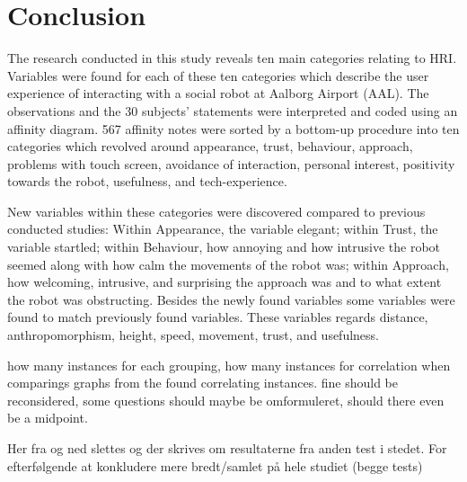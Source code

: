 \section{Conclusion}
\label{Conclusion}
%
The research conducted in this study reveals ten main categories relating to HRI. Variables were found for each of these ten categories which describe the user experience of interacting with a social robot at Aalborg Airport (AAL). The observations and the 30 subjects' statements were interpreted and coded using an affinity diagram. 567 affinity notes were sorted by a bottom-up procedure into ten categories which revolved around appearance, trust, behaviour, approach, problems with touch screen, avoidance of interaction, personal interest, positivity towards the robot, usefulness, and tech-experience.

New variables within these categories were discovered compared to previous conducted studies: Within Appearance, the variable elegant; within Trust, the variable startled; within Behaviour, how annoying and how intrusive the robot seemed along with how calm the movements of the robot was; within Approach, how welcoming, intrusive, and surprising the approach was and to what extent the robot was obstructing. Besides the newly found variables some variables were found to match previously found variables. These variables regards distance, anthropomorphism, height, speed, movement, trust, and usefulness.

how many instances for each grouping, how many instances for correlation when comparings graphs from the found correlating instances. fine should be reconsidered, some questions should maybe be omformuleret, should there even be a midpoint. 

{\color{red} Her fra og ned slettes og der skrives om resultaterne fra anden test i stedet. For efterfølgende at konkludere mere bredt/samlet på hele studiet (begge tests)}



